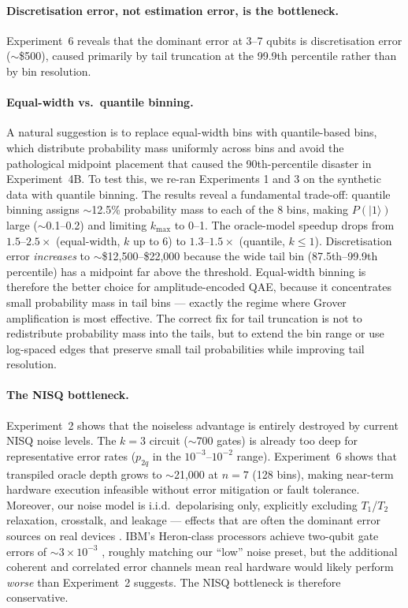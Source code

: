 \documentclass[11pt,a4paper]{article}
\begin{document}
\paragraph{Discretisation error, not estimation error, is the bottleneck.} Experiment~6 reveals that the dominant error at 3--7 qubits is discretisation error ($\sim$\$500), caused primarily by tail truncation at the 99.9th percentile rather than by bin resolution.

\paragraph{Equal-width vs.\ quantile binning.} A natural suggestion is to replace equal-width bins with quantile-based bins, which distribute probability mass uniformly across bins and avoid the pathological midpoint placement that caused the 90th-percentile disaster in Experiment~4B. To test this, we re-ran Experiments 1 and 3 on the synthetic data with quantile binning. The results reveal a fundamental trade-off: quantile binning assigns $\sim$12.5\% probability mass to each of the 8 bins, making $P(|1\rangle)$ large ($\sim$0.1--0.2) and limiting $k_{\max}$ to 0--1. The oracle-model speedup drops from $1.5$--$2.5\times$ (equal-width, $k$ up to 6) to $1.3$--$1.5\times$ (quantile, $k \leq 1$). Discretisation error \emph{increases} to $\sim$\$12{,}500--\$22{,}000 because the wide tail bin (87.5th--99.9th percentile) has a midpoint far above the threshold. Equal-width binning is therefore the better choice for amplitude-encoded QAE, because it concentrates small probability mass in tail bins --- exactly the regime where Grover amplification is most effective. The correct fix for tail truncation is not to redistribute probability mass into the tails, but to extend the bin range or use log-spaced edges that preserve small tail probabilities while improving tail resolution.

\paragraph{The NISQ bottleneck.} Experiment~2 shows that the noiseless advantage is entirely destroyed by current NISQ noise levels. The $k = 3$ circuit ($\sim$700 gates) is already too deep for representative error rates ($p_{2q}$ in the $10^{-3}$--$10^{-2}$ range). Experiment~6 shows that transpiled oracle depth grows to $\sim$21{,}000 at $n = 7$ (128 bins), making near-term hardware execution infeasible without error mitigation or fault tolerance. Moreover, our noise model is i.i.d.\ depolarising only, explicitly excluding $T_1$/$T_2$ relaxation, crosstalk, and leakage --- effects that are often the dominant error sources on real devices \citep{tannu2019mitigating}. IBM's Heron-class processors achieve two-qubit gate errors of $\sim$$3 \times 10^{-3}$ \citep{mckay2023benchmarking}, roughly matching our ``low'' noise preset, but the additional coherent and correlated error channels mean real hardware would likely perform \emph{worse} than Experiment~2 suggests. The NISQ bottleneck is therefore conservative.
\end{document}
